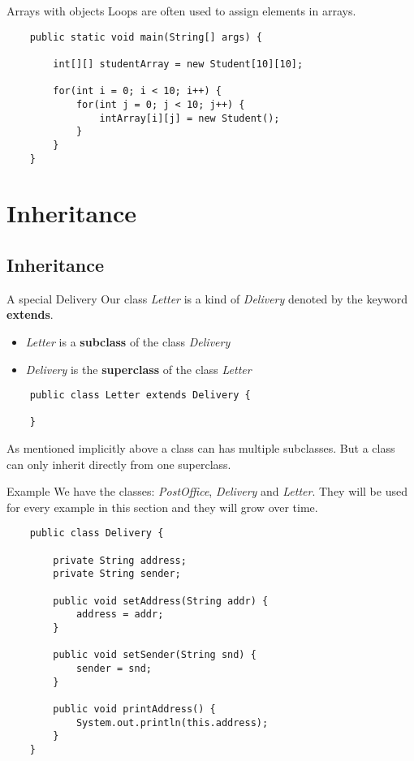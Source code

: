 \begin{frame}[fragile]{Arrays with objects}
	Loops are often used to assign elements in arrays.
	\begin{lstlisting}
	public static void main(String[] args) {

	    int[][] studentArray = new Student[10][10];
	    
	    for(int i = 0; i < 10; i++) {
	        for(int j = 0; j < 10; j++) {
	            intArray[i][j] = new Student();
	        }
	    }
	}
	\end{lstlisting}
\end{frame}

\section{Inheritance}
\subsection{Inheritance}


\begin{frame}[fragile]{A special Delivery}
	Our class \emph{Letter} is a kind of \emph{Delivery} denoted by the keyword \textbf{extends}.
	\begin{itemize}
		\item \emph{Letter} is a \textbf{subclass} of the class \emph{Delivery}
		\item \emph{Delivery} is the \textbf{superclass} of the class \emph{Letter}
	\end{itemize}
	\begin{lstlisting}
	public class Letter extends Delivery {
	
	}
	\end{lstlisting}
	\vfill
	As mentioned implicitly above a class can has multiple subclasses. 
	But a class can only inherit directly from one superclass.
\end{frame}

\begin{frame}[fragile]{Example}
	We have the classes: \emph{PostOffice}, \emph{Delivery} and \emph{Letter}.
	They will be used for every example in this section and they will grow over time.
	\begin{lstlisting}
	public class Delivery {
	
	    private String address;
	    private String sender;
	    
	    public void setAddress(String addr) {
			address = addr;
	    }
	    
	    public void setSender(String snd) {
			sender = snd;
	    }
	    
	    public void printAddress() {
	        System.out.println(this.address);
	    }
	}
	\end{lstlisting}
\end{frame}

